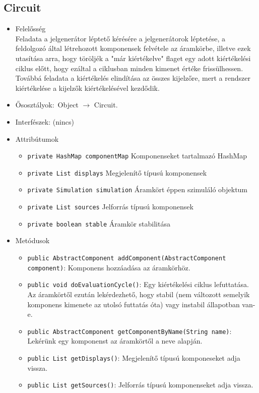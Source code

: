 \subsection{Circuit}
\begin{itemize}
\item Felelősség\\
Feladata a jelgenerátor léptető kérésére a jelgenerátorok léptetése, a feldolgozó  által létrehozott komponensek felvétele az áramkörbe, illetve ezek utasítása arra,  hogy töröljék a "már kiértékelve" flaget egy adott kiértékelési ciklus előtt, hogy ezáltal a  ciklusban minden kimenet értéke frissülhessen.  Továbbá feladata a kiértékelés elindítása az összes kijelzőre, mert a rendszer kiértékelése  a kijelzők kiértékelésével kezdődik.
\item Ősosztályok:\ Object $\rightarrow{}$ Circuit.
\item Interfészek: (nincs)
\item Attribútumok $\ $
\begin{itemize}
	\item \texttt{private HashMap componentMap} Komponenseket tartalmazó HashMap
	\item \texttt{private List displays} Megjelenítő típusú komponensek
	\item \texttt{private Simulation simulation} Áramkört éppen szimuláló objektum
	\item \texttt{private List sources} Jelforrás típusú komponensek
	\item \texttt{private boolean stable} Áramkör stabilitása
\end{itemize}
\item Metódusok$\ $
\begin{itemize}
	\item \texttt{public AbstractComponent addComponent(AbstractComponent component)}: Komponens hozzáadása az áramkörhöz.
	\item \texttt{public void doEvaluationCycle()}: Egy kiértékelési ciklus lefuttatása. Az áramkörtől ezután lekérdezhető, hogy  stabil (nem változott semelyik komponens kimenete az utolsó futtatás óta)  vagy instabil állapotban van-e.
	\item \texttt{public AbstractComponent getComponentByName(String name)}: Lekérünk egy komponenst az áramkörtől a neve alapján.
	\item \texttt{public List getDisplays()}: Megjelenítő típusú komponeseket adja vissza.
	\item \texttt{public List getSources()}: Jelforrás típusú komponenseket adja vissza.

\end{itemize}
\end{itemize}
